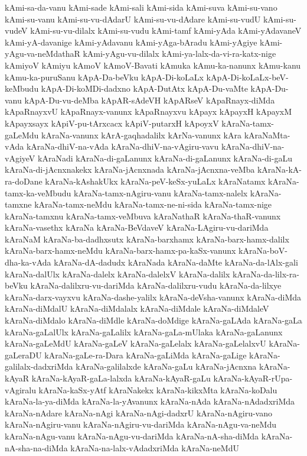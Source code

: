 {kAmi-sa-da-vanu
kAmi-sade
kAmi-sali
kAmi-sida
kAmi-suva
kAmi-su-vano
kAmi-su-vanu
kAmi-su-vu-dAdarU
kAmi-su-vu-dAdare
kAmi-su-vudU
kAmi-su-vudeV
kAmi-su-vu-dilalx
kAmi-su-vudu
kAmi-tamf
kAmi-yAda
kAmi-yAdavaneV
kAmi-yA-davanige
kAmi-yAdavanu
kAmi-yAga-bAradu
kAmi-yAgiye
kAmi-yAgu-va-neMdathaR
kAmi-yAgu-vu-dilalx
kAmi-ya-lalx-da-vi-ra-katx-nige
kAmiyoV
kAmiyu
kAmoV
kAmoV-Bavati
kAmuka
kAmu-ka-nanunx
kAmu-kanu
kAmu-ka-puruSanu
kApA-Da-beVku
kApA-Di-koLaLx
kApA-Di-koLaLx-beV-keMbudu
kApA-Di-koMDi-dadxno
kApA-DutAtx
kApA-Du-vaMte
kApA-Du-vanu
kApA-Du-vu-deMba
kApAR-sAdeVH
kApARseV
kApaRnayx-diMda
kApaRnayxvU
kApaRnayx-vanunx
kApaRnayxvu
kApayx
kApayxH
kApayxM
kApayxsayx
kApiV-pu-tArxcacx
kApiV-putarxH
kApoyxV
kAraNa-tamx-gaLeMdu
kAraNa-vanunx
kArA-gaqhadalilx
kArNa-vanunx
kAra
kAraNaMta-vAda
kAraNa-dhiV-na-vAda
kAraNa-dhiV-na-vAgiru-vavu
kAraNa-dhiV-na-vAgiyeV
kAraNadi
kAraNa-di-gaLanunx
kAraNa-di-gaLanunx
kAraNa-di-gaLu
kAraNa-di-jAcnxnakekx
kAraNa-jAcnxnada
kAraNa-jAcnxna-veMba
kAraNa-kA-ra-doDane
kAraNa-kAshakUkx
kAraNa-peV-keSx-yuLaLx
kAraNatamx
kAraNa-tamx-ka-veMbudu
kAraNa-tamx-nAgiru-vanu
kAraNa-tamx-nalelx
kAraNa-tamxne
kAraNa-tamx-neMdu
kAraNa-tamx-ne-ni-sida
kAraNa-tamx-nige
kAraNa-tamxnu
kAraNa-tamx-veMbuva
kAraNathaR
kAraNa-thaR-vanunx
kAraNa-vasethx
kAraNa
kAraNa-BeVdaveV
kAraNa-LAgiru-vu-dariMda
kAraNaM
kAraNa-ba-dadhxsutx
kAraNa-barxhamx
kAraNa-barx-hamx-dalilx
kAraNa-barx-hamx-neMdu
kAraNa-barx-hamx-pa-kaSx-vanunx
kAraNa-boV-dha-ka-vAda
kAraNa-dA-dadudx
kAraNada
kAraNa-daMte
kAraNa-da-lAlx-gali
kAraNa-dalUlx
kAraNa-dalelx
kAraNa-dalelxV
kAraNa-dalilx
kAraNa-da-lilx-ra-beVku
kAraNa-dalilxru-vu-dariMda
kAraNa-dalilxru-vudu
kAraNa-da-lilxye
kAraNa-darx-vayxvu
kAraNa-dashe-yalilx
kAraNa-deVsha-vanunx
kAraNa-diMda
kAraNa-diMdalU
kAraNa-diMdalalx
kAraNa-diMdale
kAraNa-diMdaleV
kAraNa-diMdalo
kAraNa-diMdle
kAraNa-doMdige
kAraNa-gaLAda
kAraNa-gaLa
kAraNa-gaLalUlx
kAraNa-gaLalilx
kAraNa-gaLa-mUlaka
kAraNa-gaLanunx
kAraNa-gaLeMdU
kAraNa-gaLeV
kAraNa-gaLelalx
kAraNa-gaLelalxvU
kAraNa-gaLeraDU
kAraNa-gaLe-ra-Dara
kAraNa-gaLiMda
kAraNa-gaLige
kAraNa-galilalx-dadxriMda
kAraNa-galilalxde
kAraNa-gaLu
kAraNa-jAcnxna
kAraNa-kAyaR
kAraNa-kAyaR-gaLa-lalxda
kAraNa-kAyaR-gaLu
kAraNa-kAyaR-rUpa-vAgiralu
kAraNa-kaSx-yAtf
kAraNakekx
kAraNa-kikxMta
kAraNa-koDalu
kAraNa-la-ya-diMda
kAraNa-la-yAvanunx
kAraNa-nAda
kAraNa-nAdadxriMda
kAraNa-nAdare
kAraNa-nAgi
kAraNa-nAgi-dadxrU
kAraNa-nAgiru-vano
kAraNa-nAgiru-vanu
kAraNa-nAgiru-vu-dariMda
kAraNa-nAgu-va-neMdu
kAraNa-nAgu-vanu
kAraNa-nAgu-vu-dariMda
kAraNa-nA-sha-diMda
kAraNa-nA-sha-na-diMda
kAraNa-na-lalx-vAdadxriMda
kAraNa-neMdU
}
